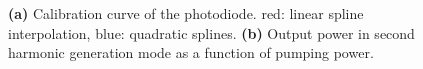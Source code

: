 \documentclass[a4paper]{scrartcl}
\numberwithin{equation}{section}
\numberwithin{figure}{section}
\numberwithin{table}{section}
\begin{document}
\begin{figure}[p]
\centering
{}
\hfill
{}
\caption{\small \textbf{(a)} Calibration curve of the photodiode. red: linear spline interpolation, blue: quadratic splines. \textbf{(b)} Output power in second harmonic generation mode as a function of pumping power.}
\label{fig:diode}
\end{figure}
\end{document}
